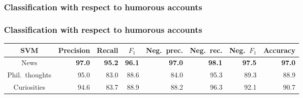 \subsubsection{Classification with respect to humorous accounts}
\begin{frame}
    \frametitle{Classification with respect to humorous accounts}

    \begin{center}
        \scriptsize
        \begin{tabular}{ c r r r r r r r }
            \textbf{SVM} & \multicolumn{1}{c}{Precision} & \multicolumn{1}{c}{Recall} & \multicolumn{1}{c}{$F_1$} & \multicolumn{1}{c}{Neg.\ prec.} & \multicolumn{1}{c}{Neg.\ rec.} & \multicolumn{1}{c}{Neg.\ $F_1$} & \multicolumn{1}{c}{Accuracy} \\
            \midrule
            News & \textbf{97.0} & \textbf{95.2} & \textbf{96.1} & \textbf{97.0} & \textbf{98.1} & \textbf{97.5} & \textbf{97.0} \\
            \midrule
            Phil.\ thoughts & 95.0 & 83.0 & 88.6 & 84.0 & 95.3 & 89.3 & 88.9 \\
            \midrule
            Curiosities & 94.6 & 83.7 & 88.9 & 88.2 & 96.3 & 92.1 & 90.7 \\
        \end{tabular}
    \end{center}
\end{frame}
